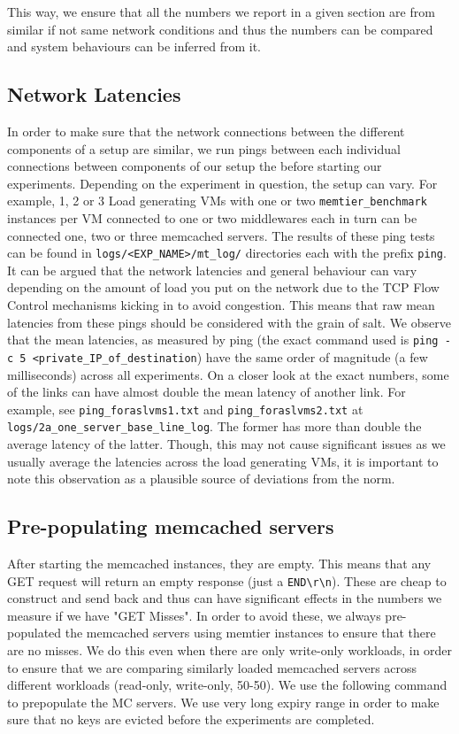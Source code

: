 \documentclass[11pt,a4paper]{article}
\begin{document}
This way, we ensure that all the numbers we report in a given section are from similar if not same network conditions and thus the numbers can be compared and system behaviours can be inferred from it.

\subsection{Network Latencies}
In order to make sure that the network connections between the different components of a setup are similar, we run pings between each individual connections between components of our setup the before starting our experiments. Depending on the experiment in question, the setup can vary. For example, 1, 2 or 3 Load generating VMs with one or two \texttt{memtier\_benchmark} instances per VM connected to one or two middlewares each in turn can be connected one, two or three memcached servers. The results of these ping tests can be found in \texttt{logs/<EXP\_NAME>/mt\_log/} directories each with the prefix \texttt{ping}. It can be argued that the network latencies and general behaviour can vary depending on the amount of load you put on the network due to the TCP Flow Control mechanisms kicking in to avoid congestion. This means that raw mean latencies from these pings should be considered with the grain of salt. We observe that the mean latencies, as measured by ping (the exact command used is \texttt{ping -c 5 <private\_IP\_of\_destination}) have the same order of magnitude (a few milliseconds) across all experiments. On a closer look at the exact numbers, some of the links can have almost double the mean latency of another link. For example, see \texttt{ping\_foraslvms1.txt} and \texttt{ping\_foraslvms2.txt} at \texttt{logs/2a\_one\_server\_base\_line\_log}. The former has more than double the average latency of the latter. Though, this may not cause significant issues as we usually average the latencies across the load generating VMs, it is important to note this observation as a plausible source of deviations from the norm. 


\subsection{Pre-populating memcached servers}
After starting the memcached instances, they are empty. This means that any GET request will return an empty response (just a \texttt{END\textbackslash r\textbackslash n}). These are cheap to construct and send back and thus can have significant effects in the numbers we measure if we have "GET Misses". In order to avoid these, we always pre-populated the memcached servers using memtier instances to ensure that there are no misses. We do this even when there are only write-only workloads, in order to ensure that we are comparing similarly loaded memcached servers across different workloads (read-only, write-only, 50-50). We use the following command to prepopulate the MC servers. We use very long expiry range in order to make sure that no keys are evicted before the experiments are completed. \\
\end{document}

